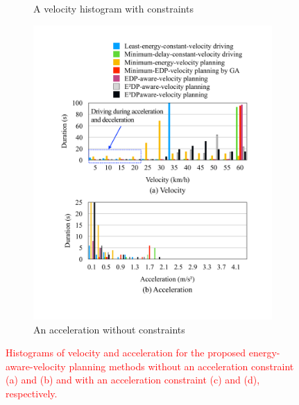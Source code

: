 \documentclass{IEEEtran}
\begin{document}
\begin{figure}
\begin{subfigure}{0.5\textwidth}
	\caption{A velocity histogram with constraints}
	\label{fig:histogram_vel}
	\end{subfigure}
	\begin{subfigure}{0.5\textwidth}
	\includegraphics[width=\hsize]{Figures/Histogram_acc.pdf}
	\caption{An acceleration without constraints}
	\label{fig:histogram_acc}
	\end{subfigure}
\caption{\textcolor{red}{Histograms of velocity and acceleration for the proposed energy-aware-velocity planning methods without an acceleration constraint (a) and (b) and with an acceleration constraint (c) and (d), respectively.}}
\label{fig:histogram}
\end{figure}
\end{document}
